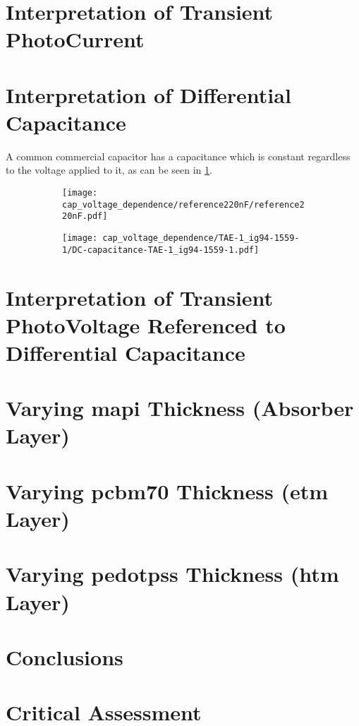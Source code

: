 \section{Interpretation of Transient PhotoCurrent}\label{interpretation_tpc}

\section{Interpretation of Differential Capacitance}\label{interpretation_dc}

A common commercial capacitor has a capacitance which is constant regardless to the voltage applied to it, as can be seen in \cref{fig:cap_voltage_dependence_commercial}.

\begin{figure}%
	\centering
	\begin{subfigure}[t]{0.45\textwidth}
		\texttt{[image: cap\_voltage\_dependence/reference220nF/reference220nF.pdf]}
		\label{fig:cap_voltage_dependence_commercial}
	\end{subfigure}
	\qquad
	\begin{subfigure}[t]{0.45\textwidth}
		\texttt{[image: cap\_voltage\_dependence/TAE-1\_ig94-1559-1/DC-capacitance-TAE-1\_ig94-1559-1.pdf]}
		\label{fig:cap_voltage_dependence_tae1}
	\end{subfigure}
	\label{fig:cap_voltage_dependence}
\end{figure}

\section{Interpretation of Transient PhotoVoltage Referenced to Differential Capacitance}\label{interpretation_tpvdc}


\section{Varying \gls{mapi} Thickness (Absorber Layer)}


\section{Varying \gls{pcbm70} Thickness (\gls{etm} Layer)}
\section{Varying \gls{pedotpss} Thickness (\gls{htm} Layer)}
\section{Conclusions}
\section{Critical Assessment}